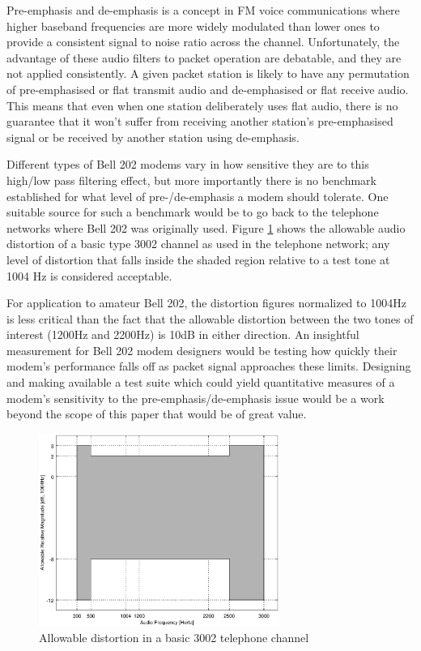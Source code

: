 \documentclass[12pt,letterpaper]{article}
\begin{document}
Pre-emphasis and de-emphasis is a concept in FM voice communications where
higher baseband frequencies are more widely modulated than lower ones
to provide a consistent signal to noise ratio across the channel.
Unfortunately, the advantage of these audio filters to packet operation 
are debatable, and they are not applied consistently. A given packet 
station is likely to have any permutation of pre-emphasised or flat 
transmit audio and de-emphasised or flat receive audio.
This means that even when one station deliberately uses flat audio,
there is no guarantee that it won't suffer from receiving another
station's pre-emphasised signal or be received by another station using de-emphasis.

Different types of Bell 202 modems vary in how sensitive they are to this high/low
pass filtering effect, but more importantly there is no benchmark established
for what level of pre-/de-emphasis a modem should tolerate.
One suitable source for such a benchmark would be to go back to the
telephone networks where Bell 202 was originally used.
Figure \ref{fig:3002} shows the allowable audio distortion of a basic type 3002
channel as used in the telephone network; any level of distortion that falls 
inside the shaded region relative to a test tone at 1004 Hz is considered acceptable.

For application to amateur Bell 202, the distortion figures normalized to 1004Hz is 
less critical than the fact that the allowable distortion between the two
tones of interest (1200Hz and 2200Hz) is 10dB in either direction.
An insightful measurement for Bell 202 modem designers would be testing how
quickly their modem's performance falls off as packet signal approaches these limits.
Designing and making available a test suite which could yield quantitative
measures of a modem's sensitivity to the pre-emphasis/de-emphasis issue would
be a work beyond the scope of this paper that would be of great value.

\begin{figure}
	\centering
	\includegraphics[width=0.7\textwidth]{src/octave/3002}
	\caption{Allowable distortion in a basic 3002 telephone channel}
	\label{fig:3002}
\end{figure}
\end{document}
